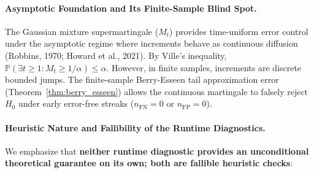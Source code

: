 \documentclass[11pt,a4paper]{article}
\begin{document}
\paragraph{Asymptotic Foundation and Its Finite-Sample Blind Spot.}
The Gaussian mixture supermartingale ($M_t$) provides time-uniform error control under the asymptotic regime where increments behave as continuous diffusion (Robbins, 1970; Howard et al., 2021). By Ville's inequality, $\mathbb{P}(\exists t \ge 1: M_t \ge 1/\alpha) \le \alpha$. However, in finite samples, increments are discrete bounded jumps. The finite-sample Berry-Esseen tail approximation error (Theorem~\ref{thm:berry_esseen}) allows the continuous martingale to falsely reject $H_0$ under early error-free streaks ($n_{\text{FN}} = 0$ or $n_{\text{FP}} = 0$).

\paragraph{Heuristic Nature and Fallibility of the Runtime Diagnostics.}
We emphasize that \textbf{neither runtime diagnostic provides an unconditional theoretical guarantee on its own; both are fallible heuristic checks}:
\end{document}
